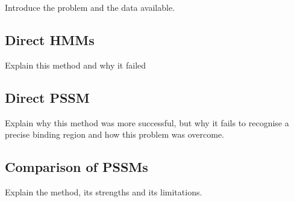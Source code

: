 Introduce the problem and the data available.

\subsection{Direct HMMs}
\label{sec:hmm_binding}

Explain this method and why it failed

\subsection{Direct PSSM}
\label{sec:pssm_binding}

Explain why this method was more successful, but why it fails to recognise a
precise binding region and how this problem was overcome.

\subsection{Comparison of PSSMs}
\label{sec:pssm_comparison}

Explain the method, its strengths and its limitations.

